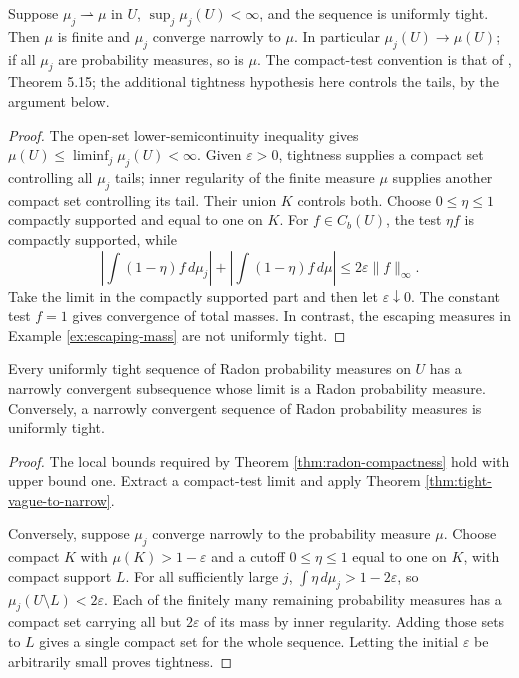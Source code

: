 \begin{theorem}\label{thm:tight-vague-to-narrow}
Suppose $\mu_j\rightharpoonup\mu$ in $U$, $\sup_j\mu_j(U)<\infty$, and the sequence is uniformly tight. Then $\mu$ is finite and $\mu_j$ converge narrowly to $\mu$. In particular $\mu_j(U)\to\mu(U)$; if all $\mu_j$ are probability measures, so is $\mu$. The compact-test convention is that of \cite{Sim18}, Theorem 5.15; the additional tightness hypothesis here controls the tails, by the argument below.
\end{theorem}
\begin{proof}
The open-set lower-semicontinuity inequality gives $\mu(U)\leq\liminf_j\mu_j(U)<\infty$. Given $\varepsilon>0$, tightness supplies a compact set controlling all $\mu_j$ tails; inner regularity of the finite measure $\mu$ supplies another compact set controlling its tail. Their union $K$ controls both. Choose $0\leq\eta\leq1$ compactly supported and equal to one on $K$. For $f\in C_b(U)$, the test $\eta f$ is compactly supported, while
\[
 \left|\int(1-\eta)f\,d\mu_j\right|
 +\left|\int(1-\eta)f\,d\mu\right|\leq2\varepsilon\|f\|_\infty.
\]
Take the limit in the compactly supported part and then let $\varepsilon\downarrow0$. The constant test $f=1$ gives convergence of total masses. In contrast, the escaping measures in Example \ref{ex:escaping-mass} are not uniformly tight.
\end{proof}

\begin{corollary}\label{cor:tight-probability-compactness}
Every uniformly tight sequence of Radon probability measures on $U$ has a narrowly convergent subsequence whose limit is a Radon probability measure. Conversely, a narrowly convergent sequence of Radon probability measures is uniformly tight.
\end{corollary}
\begin{proof}
The local bounds required by Theorem \ref{thm:radon-compactness} hold with upper bound one. Extract a compact-test limit and apply Theorem \ref{thm:tight-vague-to-narrow}.

Conversely, suppose $\mu_j$ converge narrowly to the probability measure $\mu$. Choose compact $K$ with $\mu(K)>1-\varepsilon$ and a cutoff $0\leq\eta\leq1$ equal to one on $K$, with compact support $L$. For all sufficiently large $j$, $\int\eta\,d\mu_j>1-2\varepsilon$, so $\mu_j(U\setminus L)<2\varepsilon$. Each of the finitely many remaining probability measures has a compact set carrying all but $2\varepsilon$ of its mass by inner regularity. Adding those sets to $L$ gives a single compact set for the whole sequence. Letting the initial $\varepsilon$ be arbitrarily small proves tightness.
\end{proof}

